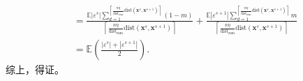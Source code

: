 \documentclass[12pt,a4paper]{article}%
\begin{document}
$$\begin{aligned}
		&=
		\frac{\mathbb{E}|\varepsilon^s|\textstyle\sum_{d=1}^{{\left\lceil \frac{n\eta }{\text{dist}_{\text{sum}}}\text{dist}(\boldsymbol{x}^s,\boldsymbol{x}^{s+1})\right\rceil}}{
		(1-m)}}{\left\lceil \frac{n\eta }{\text{dist}_{\text{sum}}}\text{dist}(\boldsymbol{x}^s,\boldsymbol{x}^{s+1})\right\rceil} + \frac{{\mathbb{E}|\varepsilon^{s+1}|}\textstyle\sum_{d=1}^{\left\lceil \frac{n\eta}{\text{dist}_{\text{sum}}}\text{dist}(\boldsymbol{x}^s,\boldsymbol{x}^{s+1})\right\rceil}m}{\left\lceil \frac{n\eta }{\text{dist}_{\text{sum}}}\text{dist}(\boldsymbol{x}^s,\boldsymbol{x}^{s+1})\right\rceil}
		\\
		&=\mathbb{E}(\frac{|\varepsilon^s|+|\varepsilon^{s+1}|}{2}).
		\end{aligned}$$
	综上，得证。


	
	
	
	
	\


	

	
\end{document}
